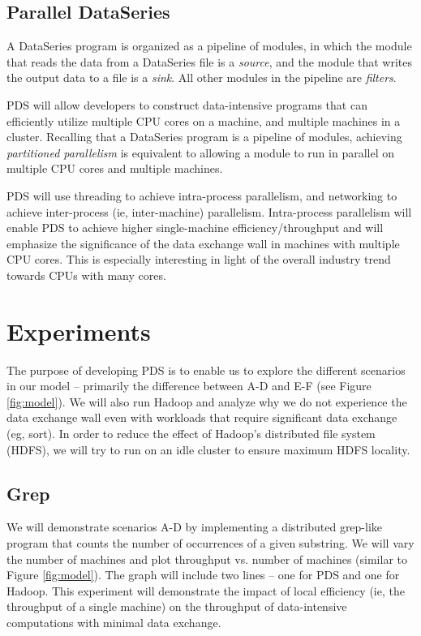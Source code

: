 \documentclass{acm_proc_article-sp}
\begin{document}
\subsection{Parallel DataSeries}
A DataSeries program is organized as a pipeline of modules, in which the module that reads the data from a DataSeries file is a \emph{source}, and the module that writes the output data to a file is a \emph{sink}. All other modules in the pipeline are \emph{filters}.

PDS will allow developers to construct data-intensive programs that can efficiently utilize multiple CPU cores on a machine, and multiple machines in a cluster. Recalling that a DataSeries program is a pipeline of modules, achieving \emph{partitioned parallelism} \cite{paralleldatabases} is equivalent to allowing a module to run in parallel on multiple CPU cores and multiple machines.

PDS will use threading to achieve intra-process parallelism, and networking to achieve inter-process (ie, inter-machine) parallelism. Intra-process parallelism will enable PDS to achieve higher single-machine efficiency/throughput and will emphasize the significance of the data exchange wall in machines with multiple CPU cores. This is especially interesting in light of the overall industry trend towards CPUs with many cores.

\section{Experiments}
The purpose of developing PDS is to enable us to explore the different scenarios in our model -- primarily the difference between A-D and E-F (see Figure \ref{fig:model}). We will also run Hadoop and analyze why we do not experience the data exchange wall even with workloads that require significant data exchange (eg, sort). In order to reduce the effect of Hadoop's distributed file system (HDFS), we will try to run on an idle cluster to ensure maximum HDFS locality.

\subsection{Grep}
We will demonstrate scenarios A-D by implementing a distributed grep-like program that counts the number of occurrences of a given substring. We will vary the number of machines and plot throughput vs. number of machines (similar to Figure \ref{fig:model}). The graph will include two lines -- one for PDS and one for Hadoop. This experiment will demonstrate the impact of local efficiency (ie, the throughput of a single machine) on the throughput of data-intensive computations with minimal data exchange.
\end{document}
